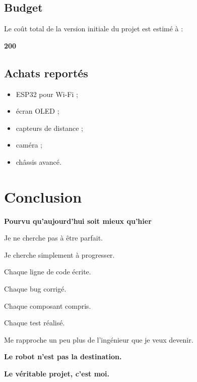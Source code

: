 \documentclass[11pt,a4paper]{article}
\begin{document}
	\subsection*{Budget}
	
	Le coût total de la version initiale du projet est estimé à :
	
	\begin{center}
		\Huge\textbf{200~\texteuro{}}
	\end{center}
	
	\subsection*{Achats reportés}
	
	\begin{itemize}
		\item ESP32 pour Wi-Fi ;
		\item écran OLED ;
		\item capteurs de distance ;
		\item caméra ;
		\item châssis avancé.
	\end{itemize}
	
	\section*{Conclusion}
	
	\begin{center}
		\Huge
		\textbf{Pourvu qu'aujourd'hui soit mieux qu'hier}
		
		\vspace{0.8cm}
		
		\Large
		Je ne cherche pas à être parfait.
		
		Je cherche simplement à progresser.
		
		Chaque ligne de code écrite.
		
		Chaque bug corrigé.
		
		Chaque composant compris.
		
		Chaque test réalisé.
		
		Me rapproche un peu plus de l'ingénieur que je veux devenir.
	\end{center}
	
	\vfill
	
	\begin{center}
		\Large
		\textbf{Le robot n'est pas la destination.}
		
		\vspace{0.3cm}
		
		\textbf{Le véritable projet, c'est moi.}
	\end{center}
	
\end{document}

